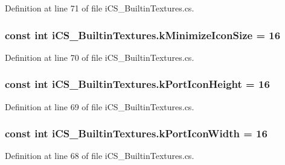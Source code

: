 Definition at line 71 of file i\+C\+S\+\_\+\+Builtin\+Textures.\+cs.

\hypertarget{classi_c_s___builtin_textures_a85cda91ec7fc096ff7d69fc48fddd735}{
\subsubsection[{k\+Minimize\+Icon\+Size}]{\setlength{\rightskip}{0pt plus 5cm}const int i\+C\+S\+\_\+\+Builtin\+Textures.\+k\+Minimize\+Icon\+Size = 16}}\label{classi_c_s___builtin_textures_a85cda91ec7fc096ff7d69fc48fddd735}


Definition at line 70 of file i\+C\+S\+\_\+\+Builtin\+Textures.\+cs.

\hypertarget{classi_c_s___builtin_textures_a667f3244020ef10d1d8f4a29de03f4ab}{
\subsubsection[{k\+Port\+Icon\+Height}]{\setlength{\rightskip}{0pt plus 5cm}const int i\+C\+S\+\_\+\+Builtin\+Textures.\+k\+Port\+Icon\+Height = 16}}\label{classi_c_s___builtin_textures_a667f3244020ef10d1d8f4a29de03f4ab}


Definition at line 69 of file i\+C\+S\+\_\+\+Builtin\+Textures.\+cs.

\hypertarget{classi_c_s___builtin_textures_a0aeb6dbe2682851d30b39e682f92b81b}{
\subsubsection[{k\+Port\+Icon\+Width}]{\setlength{\rightskip}{0pt plus 5cm}const int i\+C\+S\+\_\+\+Builtin\+Textures.\+k\+Port\+Icon\+Width = 16}}\label{classi_c_s___builtin_textures_a0aeb6dbe2682851d30b39e682f92b81b}


Definition at line 68 of file i\+C\+S\+\_\+\+Builtin\+Textures.\+cs.


